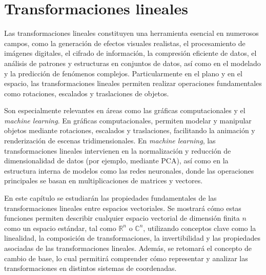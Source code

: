 \chapter{Transformaciones lineales}\label{translineales}

Las transformaciones lineales constituyen una herramienta esencial en numerosos campos, como la generación de efectos visuales realistas, el procesamiento de imágenes digitales, el cifrado de información, la compresión eficiente de datos, el análisis de patrones y estructuras en conjuntos de datos, así como en el modelado y la predicción de fenómenos complejos. Particularmente en el plano y en el espacio, las transformaciones lineales permiten realizar operaciones fundamentales como rotaciones, escalados y traslaciones de objetos.

Son especialmente relevantes en áreas como las gráficas computacionales y el \textit{machine learning}. En gráficas computacionales, permiten modelar y manipular objetos mediante rotaciones, escalados y traslaciones, facilitando la animación y renderización de escenas tridimensionales. En \textit{machine learning}, las transformaciones lineales intervienen en la normalización y reducción de dimensionalidad de datos (por ejemplo, mediante PCA), así como en la estructura interna de modelos como las redes neuronales, donde las operaciones principales se basan en multiplicaciones de matrices y vectores.

En este capítulo se estudiarán las propiedades fundamentales de las transformaciones lineales entre espacios vectoriales. Se mostrará cómo estas funciones permiten describir cualquier espacio vectorial de dimensión finita $n$ como un espacio estándar, tal como $\mathbb{R}^n$ o $\mathbb{C}^n$, utilizando conceptos clave como la linealidad, la composición de transformaciones, la invertibilidad y las propiedades asociadas de las transformaciones lineales. Además, se retomará el concepto de cambio de base, lo cual permitirá comprender cómo representar y analizar las transformaciones en distintos sistemas de coordenadas.


